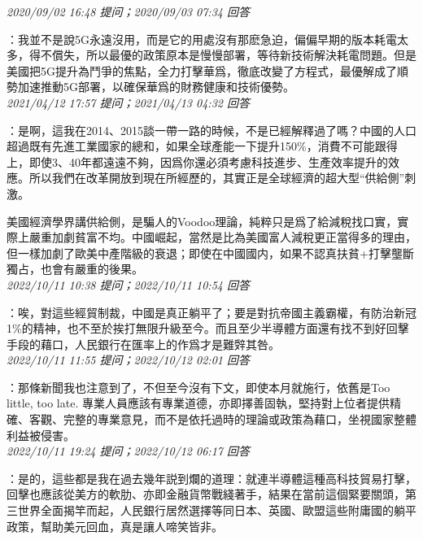 \documentclass[twocolumn]{ctexart}
\begin{document}
\textit{\hfill\noindent\small 2020/09/02 16:48 提问；2020/09/03 07:34 回答}

：我並不是說5G永遠沒用，而是它的用處沒有那麽急迫，偏偏早期的版本耗電太多，得不償失，所以最優的政策原本是慢慢部署，等待新技術解決耗電問題。但是美國把5G提升為鬥爭的焦點，全力打擊華爲，徹底改變了方程式，最優解成了順勢加速推動5G部署，以確保華爲的財務健康和技術優勢。
\\

\textit{\hfill\noindent\small 2021/04/12 17:57 提问；2021/04/13 04:32 回答}

：是啊，這我在2014、2015談一帶一路的時候，不是已經解釋過了嗎？中國的人口超過既有先進工業國家的總和，如果全球產能一下提升150\%，消費不可能跟得上，即使3、40年都遠遠不夠，因爲你還必須考慮科技進步、生產效率提升的效應。所以我們在改革開放到現在所經歷的，其實正是全球經濟的超大型“供給側”刺激。

美國經濟學界講供給側，是騙人的Voodoo理論，純粹只是爲了給減稅找口實，實際上嚴重加劇貧富不均。中國崛起，當然是比為美國富人減稅更正當得多的理由，但一樣加劇了歐美中產階級的衰退；即使在中國國内，如果不認真扶貧+打擊壟斷獨占，也會有嚴重的後果。
\\

\textit{\hfill\noindent\small 2022/10/11 10:38 提问；2022/10/11 10:54 回答}

：唉，對這些經貿制裁，中國是真正躺平了；要是對抗帝國主義霸權，有防治新冠1\%的精神，也不至於挨打無限升級至今。而且至少半導體方面還有找不到好回擊手段的藉口，人民銀行在匯率上的作爲才是難辤其咎。
\\

\textit{\hfill\noindent\small 2022/10/11 11:55 提问；2022/10/12 02:01 回答}

：那條新聞我也注意到了，不但至今沒有下文，即使本月就施行，依舊是Too little, too late. 專業人員應該有專業道德，亦即擇善固執，堅持對上位者提供精確、客觀、完整的專業意見，而不是依托過時的理論或政策為藉口，坐視國家整體利益被侵害。
\\

\textit{\hfill\noindent\small 2022/10/11 19:24 提问；2022/10/12 06:17 回答}

：是的，這些都是我在過去幾年説到爛的道理：就連半導體這種高科技貿易打擊，回擊也應該從美方的軟肋、亦即金融貨幣戰綫著手，結果在當前這個緊要關頭，第三世界全面揭竿而起，人民銀行居然選擇等同日本、英國、歐盟這些附庸國的躺平政策，幫助美元回血，真是讓人啼笑皆非。
\\
\end{document}
